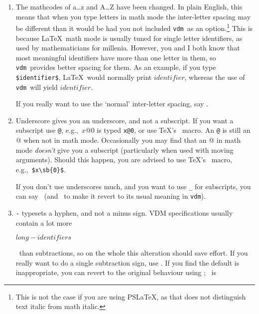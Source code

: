 \documentclass{article}
\newcommand{\Vdm}{{\tt vdm\/}}
\newenvironment{dangerous}{\par\vspace{5pt}\bgroup\small\noindent}%
                          {\par\egroup\vspace{5pt}}
\renewcommand{\^}[1]{$\langle${\rm #1\/}$\rangle$}
\newcommand{\cs}[1]{\leavevmode\hbox{\tt \string#1}}
\begin{document}
\begin{enumerate}
\item   The mathcodes of a\dots z and A\dots Z have been changed.  In
        plain English, this means that when you type letters in math
        mode the inter-letter spacing may be different than it would be
        had you not included \Vdm\ as an option.\footnote{This is not
        the case if you are using PS\LaTeX, as that does not
        distinguish text italic from math italic.}  This is because
        \LaTeX\ math mode is usually tuned for single letter
        identifiers, as used by mathematicians for millenia.  However,
        you and I both know that most meaningful identifiers have more
        than one letter in them, so \Vdm\ provides better spacing for
        them.  As an example, if you type \verb;$identifier$;, \LaTeX\
        would normally print {$identifier$}, whereas
        the use of \Vdm\ will yield $identifier$.
        \begin{dangerous}If you really want to use the
        `normal' inter-letter spacing, say \cs\defaultMathcodes.
        \end{dangerous}
\item   Underscore gives you an underscore, and not a subscript.  If
        you want a subscript use \verb;@;, e.g.,~$x@0$ is typed
        \verb;x@0;, or use \TeX's \cs\sb\ macro.  An \verb;@; is still an
        @ when not in math mode.  Occasionally you may find that an @
        in math mode {\em doesn't\/} give you a subscript
        (particularly when used with moving arguments).  Should
        this happen, you are advised to use \TeX's \cs\sb\ macro,
        e.g.,~\verb;$x\sb{0}$;.
        \begin{dangerous}
        If you don't use
        underscores much, and you want to use \verb;_; for subscripts,
        you can say \cs\underscoreon\ (and \cs\underscoreoff\ to
        make it revert to its usual meaning in \Vdm).
        \end{dangerous}
\item   \verb;-; typesets a hyphen, and not a minus sign.  VDM specifications
        usually contain a lot more
        \begin{vdm}$long-identifiers$\end{vdm}\
        than subtractions, so
        on the whole this alteration should save effort.
        If you really want
        to do a single subtraction sign, use \cs\minus.
        If you find the default is inappropriate, you can revert to
        the original behaviour using \cs\mathminus; \cs\textminus\ is

\end{enumerate}
\end{document}
